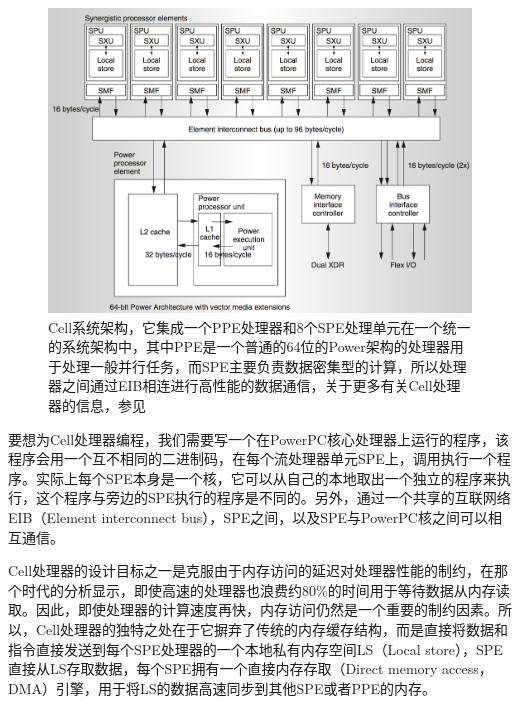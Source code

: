 \begin{figure}
\begin{fullwidth}
	\includegraphics[width=\thewidth]{figures/rp/cell-architecture}
	\caption{Cell系统架构，它集成一个PPE处理器和8个SPE处理单元在一个统一的系统架构中，其中PPE是一个普通的64位的Power架构的处理器用于处理一般并行任务，而SPE主要负责数据密集型的计算，所以处理器之间通过EIB相连进行高性能的数据通信，关于更多有关Cell处理器的信息，参见\cite{a:SynergisticProcessinginCellsMulticoreArchitecture}}
	\label{f:rp-cell}
\end{fullwidth}
\end{figure}

要想为Cell处理器编程，我们需要写一个在PowerPC核心处理器上运行的程序，该程序会用一个互不相同的二进制码，在每个流处理器单元SPE上，调用执行一个程序。实际上每个SPE本身是一个核，它可以从自己的本地取出一个独立的程序来执行，这个程序与旁边的SPE执行的程序是不同的。另外，通过一个共享的互联网络EIB（Element interconnect bus），SPE之间，以及SPE与PowerPC核之间可以相互通信。

Cell处理器的设计目标之一是克服由于内存访问的延迟对处理器性能的制约，在那个时代的分析显示，即使高速的处理器也浪费约80\%的时间用于等待数据从内存读取。因此，即使处理器的计算速度再快，内存访问仍然是一个重要的制约因素。所以，Cell处理器的独特之处在于它摒弃了传统的内存缓存结构，而是直接将数据和指令直接发送到每个SPE处理器的一个本地私有内存空间LS（Local store），SPE直接从LS存取数据，每个SPE拥有一个直接内存存取（Direct memory access，DMA）引擎，用于将LS的数据高速同步到其他SPE或者PPE的内存。

